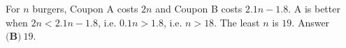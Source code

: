 For $n$ burgers, Coupon A costs $2n$ and Coupon B costs $2.1n-1.8$. A is better when $2n<2.1n-1.8$, i.e. $0.1n>1.8$, i.e. $n>18$. The least $n$ is $19$. Answer $\boxed{\textbf{(B)}\ 19}$.

